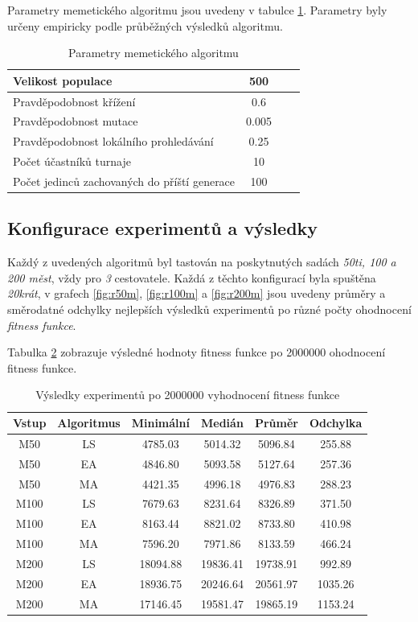 \documentclass[journal]{IEEEtrancz}
\begin{document}
Parametry memetického algoritmu jsou uvedeny v tabulce \ref{tab:ma}. Parametry byly určeny empiricky podle průběžných výsledků algoritmu.

\begin{table}
  \centering
  \caption{Parametry memetického algoritmu}
  \begin{tabular}{|l||c|c|c|}
  \hline
   Velikost populace  & 500 \\
  \hline
   Pravděpodobnost křížení & 0.6 \\
  \hline
   Pravděpodobnost mutace & 0.005 \\
  \hline
   Pravděpodobnost lokálního prohledávání & 0.25 \\
  \hline
   Počet účastníků turnaje & 10 \\
  \hline
   Počet jedinců zachovaných do příští generace & 100 \\
  \hline
  \end{tabular}
  \label{tab:ma}
\end{table}

\subsection{Konfigurace experimentů a výsledky}
Každý z uvedených algoritmů byl tastován na poskytnutých sadách \textit{50ti, 100 a 200 měst}, vždy pro \textit{3} cestovatele. Každá z těchto konfigurací byla spuštěna \textit{20krát}, v grafech \ref{fig:r50m}, \ref{fig:r100m} a \ref{fig:r200m} jsou uvedeny průměry a směrodatné odchylky nejlepších výsledků experimentů po různé počty ohodnocení \textit{fitness funkce}.

Tabulka \ref{tab:sum} zobrazuje výsledné hodnoty fitness funkce po 2000000 ohodnocení fitness funkce. 

\begin{table}
  \centering
  \caption{Výsledky experimentů po 2000000 vyhodnocení fitness funkce}
  \begin{tabular}{|c|c||c|c|c|c|}
  \hline
    Vstup & Algoritmus & Minimální & Medián & Průměr & Odchylka \\
  \hline
  \hline
  M50 & LS & 4785.03 & 5014.32 & 5096.84 & 255.88 \\
  \hline
  M50 & EA & 4846.80 & 5093.58 & 5127.64 & 257.36 \\
  \hline
  M50 & MA & 4421.35 & 4996.18 & 4976.83 & 288.23 \\
  \hline
  M100 & LS & 7679.63 & 8231.64 & 8326.89 & 371.50 \\
  \hline
  M100 & EA & 8163.44 & 8821.02 & 8733.80 & 410.98 \\
  \hline
  M100 & MA & 7596.20 & 7971.86 & 8133.59 & 466.24 \\
  \hline
  M200 & LS & 18094.88 & 19836.41 & 19738.91 & 992.89 \\
  \hline
  M200 & EA & 18936.75 & 20246.64 & 20561.97 & 1035.26 \\
  \hline
  M200 & MA & 17146.45 & 19581.47 & 19865.19 & 1153.24 \\
  \hline
  \end{tabular}
  \label{tab:sum}
\end{table}
\end{document}
